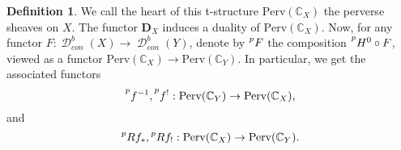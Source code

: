 \documentclass[12pt]{amsart}
\newcommand{\C}{\mathbb{C}}
\DeclareMathOperator{\D}{\mathcal{D}}
\newcommand{\F}{\mathscr{F}}
\newcommand{\sH}{\mathscr{H}}
\theoremstyle{definition}
\newtheorem{definition}[theorem]{Definition}
\theoremstyle{remark}
\numberwithin{equation}{section}
\begin{document}
\begin{definition}
    We call the heart of this t-structure $\text{Perv}(\C_X)$ the perverse sheaves on $X$. The functor $\mathbf{D}_X$ induces a duality of $\text{Perv}(\C_X)$.
    Now, for any functor $F: \D^b_{con}(X) \to \D^b_{con}(Y)$,
    denote by $\prescript{p}{}{F}$ the composition $\prescript{p}{}{H^0} \circ F$, viewed as a functor $\text{Perv}(\C_X) \to \text{Perv}(\C_Y)$.
    In particular, we get the associated functors
    \begin{equation*}
        \prescript{p}{}{f^{-1}},  \prescript{p}{}{f^{!}}: 
        \text{Perv}(\C_Y) \to \text{Perv}(\C_X),
    \end{equation*}
    and
    \begin{equation*}
        \prescript{p}{}{Rf_*}, \prescript{p}{}{Rf_!}:
        \text{Perv}(\C_X) \to \text{Perv}(\C_Y).
    \end{equation*}
\end{definition}





\end{document}
